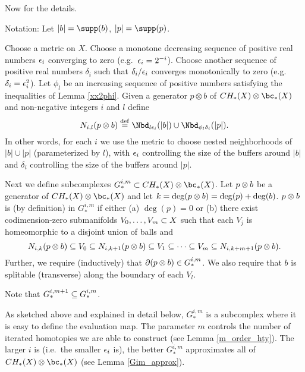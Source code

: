 \medskip

Now for the details.

Notation: Let $|b| = \supp(b)$, $|p| = \supp(p)$.

Choose a metric on $X$.
Choose a monotone decreasing sequence of positive real numbers $\epsilon_i$ converging to zero
(e.g.\ $\epsilon_i = 2^{-i}$).
Choose another sequence of positive real numbers $\delta_i$ such that $\delta_i/\epsilon_i$
converges monotonically to zero (e.g.\ $\delta_i = \epsilon_i^2$).
Let $\phi_l$ be an increasing sequence of positive numbers
satisfying the inequalities of Lemma \ref{xx2phi}.
Given a generator $p\otimes b$ of $CH_*(X)\otimes \bc_*(X)$ and non-negative integers $i$ and $l$
define
\[
	N_{i,l}(p\ot b) \deq \Nbd_{l\ep_i}(|b|) \cup \Nbd_{\phi_l\delta_i}(|p|).
\]
In other words, for each $i$
we use the metric to choose nested neighborhoods of $|b|\cup |p|$ (parameterized
by $l$), with $\epsilon_i$ controlling the size of the buffers around $|b|$ and $\delta_i$ controlling
the size of the buffers around $|p|$.

Next we define subcomplexes $G_*^{i,m} \sub CH_*(X)\otimes \bc_*(X)$.
Let $p\otimes b$ be a generator of $CH_*(X)\otimes \bc_*(X)$ and let $k = \deg(p\otimes b)
= \deg(p) + \deg(b)$.
$p\otimes b$ is (by definition) in $G_*^{i,m}$ if either (a) $\deg(p) = 0$ or (b)
there exist codimension-zero submanifolds $V_0,\ldots,V_m \subset X$ such that each $V_j$
is homeomorphic to a disjoint union of balls and
\[
	N_{i,k}(p\otimes b) \subseteq V_0 \subseteq N_{i,k+1}(p\otimes b)
			\subseteq V_1 \subseteq \cdots \subseteq V_m \subseteq N_{i,k+m+1}(p\otimes b) .
\]
Further, we require (inductively) that $\partial(p\otimes b) \in G_*^{i,m}$.
We also require that $b$ is splitable (transverse) along the boundary of each $V_l$.

Note that $G_*^{i,m+1} \subseteq G_*^{i,m}$.

As sketched above and explained in detail below, 
$G_*^{i,m}$ is a subcomplex where it is easy to define
the evaluation map.
The parameter $m$ controls the number of iterated homotopies we are able to construct
(see Lemma \ref{m_order_hty}).
The larger $i$ is (i.e.\ the smaller $\epsilon_i$ is), the better $G_*^{i,m}$ approximates all of
$CH_*(X)\ot \bc_*(X)$ (see Lemma \ref{Gim_approx}).

